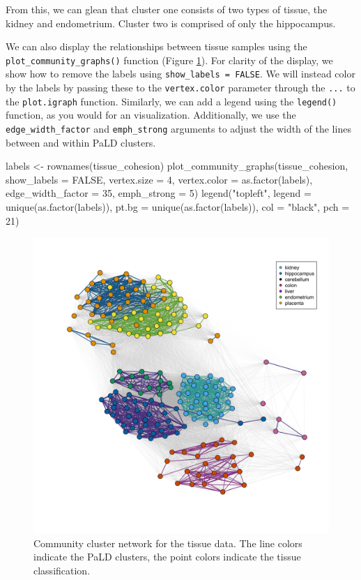 From this, we can glean that cluster one consists of two types of
tissue, the kidney and endometrium. Cluster two is comprised of only the
hippocampus.

We can also display the relationships between tissue samples using the
\texttt{plot\_community\_graphs()} function (Figure \ref{fig:fig4}). For
clarity of the display, we show how to remove the labels using
\texttt{show\_labels\ =\ FALSE}. We will instead color by the labels by
passing these to the \texttt{vertex.color} parameter through the
\texttt{...} to the \texttt{plot.igraph} function. Similarly, we can add
a legend using the \texttt{legend()} function, as you would for an
 visualization. Additionally, we use the
\texttt{edge\_width\_factor} and \texttt{emph\_strong} arguments to
adjust the width of the lines between and within PaLD clusters.

\begin{Schunk}
\begin{Sinput}
labels <- rownames(tissue_cohesion)
plot_community_graphs(tissue_cohesion,
                      show_labels = FALSE,
                      vertex.size = 4,
                      vertex.color = as.factor(labels),
                      edge_width_factor = 35,
                      emph_strong = 5) 
legend("topleft", 
       legend = unique(as.factor(labels)), 
       pt.bg = unique(as.factor(labels)),
       col = "black",
       pch = 21)
\end{Sinput}
\end{Schunk}

\begin{Schunk}
\begin{figure}
\includegraphics[width=1\linewidth]{fig5} \caption[Community cluster network for the tissue data]{Community cluster network for the tissue data. The line colors indicate the PaLD clusters, the point colors indicate the tissue classification.}\label{fig:fig4}
\end{figure}
\end{Schunk}

